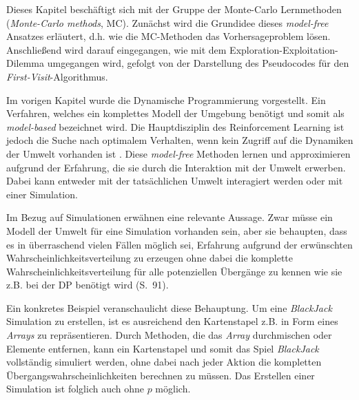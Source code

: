 Dieses Kapitel beschäftigt sich mit der Gruppe der Monte-Carlo Lernmethoden (\textit{Monte-Carlo methods}, MC). Zunächst wird die Grundidee dieses \textit{model-free} Ansatzes erläutert, d.h. wie die MC-Methoden das Vorhersageproblem lösen. Anschließend wird darauf eingegangen, wie mit dem Exploration-Exploitation-Dilemma umgegangen wird, gefolgt von der Darstellung des Pseudocodes für den \textit{First-Visit}-Algorithmus.
\par 

Im vorigen Kapitel wurde die Dynamische Programmierung vorgestellt. Ein Verfahren, welches ein komplettes Modell der Umgebung benötigt und somit als \textit{model-based} bezeichnet wird. Die Hauptdisziplin des Reinforcement Learning ist jedoch die Suche nach optimalem Verhalten, wenn kein Zugriff auf die Dynamiken der Umwelt vorhanden ist \cite[S.~27]{Wiering}. Diese \textit{model-free} Methoden lernen und approximieren aufgrund der Erfahrung, die sie durch die Interaktion mit der Umwelt erwerben. Dabei kann entweder mit der tatsächlichen Umwelt interagiert werden oder mit einer Simulation.
\par 
Im Bezug auf Simulationen erwähnen \cite{Sutton1998} eine relevante Aussage. Zwar müsse ein Modell der Umwelt für eine Simulation vorhanden sein, aber sie behaupten, dass es in überraschend vielen Fällen möglich sei, Erfahrung aufgrund der erwünschten Wahrscheinlichkeitsverteilung zu erzeugen ohne dabei die komplette Wahrscheinlichkeitsverteilung für alle potenziellen Übergänge zu kennen wie sie z.B. bei der DP benötigt wird (S.~91). 
\par 
Ein konkretes Beispiel veranschaulicht diese Behauptung. Um eine \textit{BlackJack} Simulation zu erstellen, ist es ausreichend den Kartenstapel z.B. in Form eines \textit{Arrays} zu repräsentieren. Durch Methoden, die das \textit{Array} durchmischen oder Elemente entfernen, kann ein Kartenstapel und somit das Spiel \textit{BlackJack} vollständig simuliert werden, ohne dabei nach jeder Aktion die kompletten Übergangswahrscheinlichkeiten berechnen zu müssen. Das Erstellen einer Simulation ist folglich auch ohne $p$ möglich.
\par 

